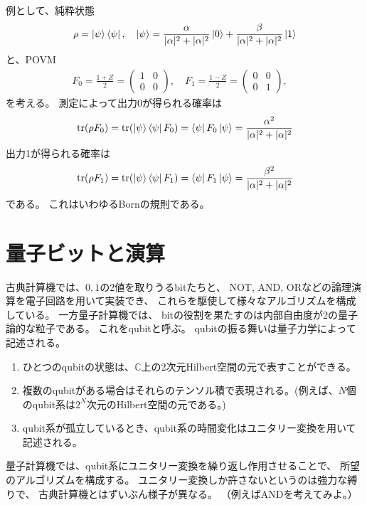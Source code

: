 \documentclass[]{ltjsarticle}
\DeclareMathOperator{\tr}{tr}
\newcommand{\complex}{\mathbb{C}}
\begin{document}
例として、純粋状態
\begin{align}
    \rho = \ket{\psi}\bra{\psi}, \quad 
    \ket{\psi} 
    =
    \frac{\alpha}{|\alpha|^2+|\alpha|^2} 
    \ket{0}   
    +
    \frac{\beta}{|\alpha|^2+|\alpha|^2}
    \ket{1}   
\end{align}
と、POVM
\begin{align}
    F_0 = \frac{1 + Z}{2}
    = \begin{pmatrix}
        1 & 0 \\ 0 & 0
    \end{pmatrix}, \quad 
    F_1 = \frac{1 - Z}{2} 
    = \begin{pmatrix}
        0 & 0 \\ 0 & 1
    \end{pmatrix}, \quad 
\end{align}
を考える。
測定によって出力0が得られる確率は
\begin{align}
    \tr(\rho F_0)
    =
    \tr(\ket{\psi}\bra{\psi} F_0)
    =
    \bra{\psi}F_0\ket{\psi}
    =
    \frac{\alpha^2}{|\alpha|^2+|\alpha|^2}
\end{align}
出力1が得られる確率は
\begin{align}
    \tr(\rho F_1)
    =
    \tr(\ket{\psi}\bra{\psi} F_1)
    =
    \bra{\psi}F_1\ket{\psi}
    =
    \frac{\beta^2}{|\alpha|^2+|\alpha|^2}
\end{align}
である。
これはいわゆるBornの規則である。



\section{量子ビットと演算}
古典計算機では、$0,1$の2値を取りうるbitたちと、
NOT, AND, ORなどの論理演算を電子回路を用いて実装でき、
これらを駆使して様々なアルゴリズムを構成している。
一方量子計算機では、
bitの役割を果たすのは内部自由度が2の量子論的な粒子である。
これをqubitと呼ぶ。
qubitの振る舞いは量子力学によって記述される。
\begin{enumerate}
    \item ひとつのqubitの状態は、$\complex$上の2次元Hilbert空間の元で表すことができる。
    \item 複数のqubitがある場合はそれらのテンソル積で表現される。(例えば、$N$個のqubit系は$2^N$次元のHilbert空間の元である。)
    \item qubit系が孤立しているとき、qubit系の時間変化はユニタリー変換を用いて記述される。
\end{enumerate}
量子計算機では、qubit系にユニタリー変換を繰り返し作用させることで、
所望のアルゴリズムを構成する。
ユニタリー変換しか許さないというのは強力な縛りで、
古典計算機とはずいぶん様子が異なる。
（例えばANDを考えてみよ。）
\end{document}
